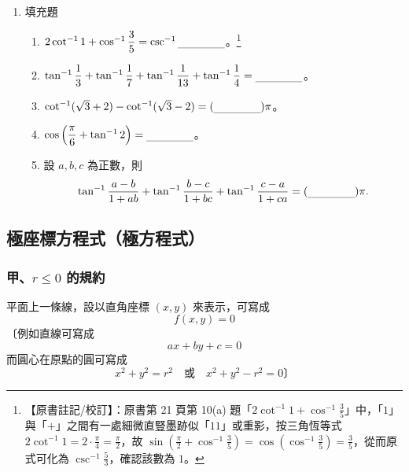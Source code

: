 \begin{enumerate}[label=\arabic*., topsep=4pt, itemsep=6pt]
  \item 填充題
  \begin{enumerate}[label=(\alph*), topsep=2pt, itemsep=6pt]
    \item $2 \cot^{-1} 1 + \cos^{-1} \dfrac{3}{5} = \csc^{-1} \blank$。\label{note:b5-ch1-p21ex10a}\footnote{【原書註記/校訂】：原書第 21 頁第 10(a) 題「$2\cot^{-1} 1 + \cos^{-1} \frac{3}{5}$」中，「$1$」與「$+$」之間有一處細微直豎墨跡似「$11$」或重影，按三角恆等式 $2\cot^{-1} 1 = 2 \cdot \frac{\pi}{4} = \frac{\pi}{2}$，故 $\sin\left(\frac{\pi}{2} + \cos^{-1}\frac{3}{5}\right) = \cos\left(\cos^{-1}\frac{3}{5}\right) = \frac{3}{5}$，從而原式可化為 $\csc^{-1}\frac{5}{3}$，確認該數為 $1$。}
    \item $\tan^{-1} \dfrac{1}{3} + \tan^{-1} \dfrac{1}{7} + \tan^{-1} \dfrac{1}{13} + \tan^{-1} \dfrac{1}{4} = \blank$。
    \item $\cot^{-1}(\sqrt{3} + 2) - \cot^{-1}(\sqrt{3} - 2) = (\blank)\pi$。
    \item $\cos\left(\dfrac{\pi}{6} + \tan^{-1} 2\right) = \blank$。
    \item 設 $a, b, c$ 為正數，則
    \[
    \tan^{-1} \frac{a - b}{1 + ab} + \tan^{-1} \frac{b - c}{1 + bc} + \tan^{-1} \frac{c - a}{1 + ca} = (\blank)\pi.
    \]
  \end{enumerate}
\end{enumerate}


\subsection{極座標方程式（極方程式）}\label{sec:b5-1-3}

\subsubsection*{甲、$r \le 0$ 的規約}\label{subsec:b5-1-3-a}

平面上一條線，設以直角座標 $(x, y)$ 來表示，可寫成
\begin{equation}\label{eq:b5-1-3-1}
  f(x, y) = 0 \tag{1}
\end{equation}
〔例如\quad 直線可寫成
\[
  ax + by + c = 0
\]
而圓心在原點的圓可寫成
\[
  x^2 + y^2 = r^2 \quad \text{或} \quad x^2 + y^2 - r^2 = 0 \text{〕}
\]

